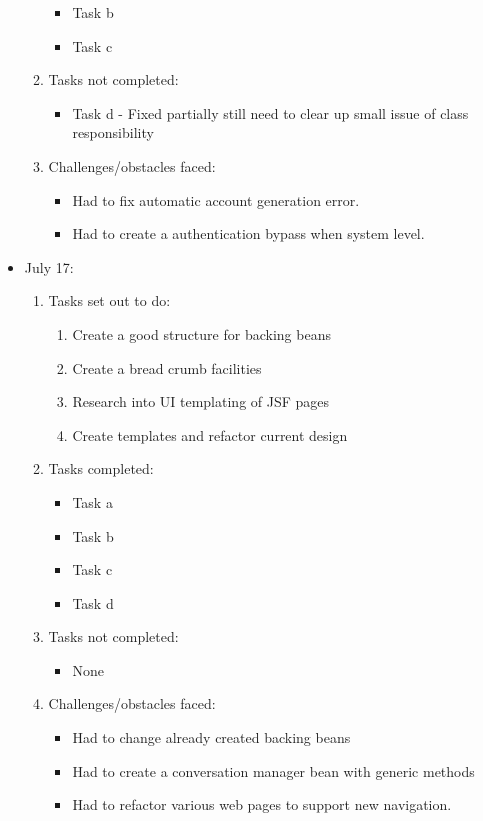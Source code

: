 \documentclass[12pt]{article}
\begin{document}
\begin{itemize}
\begin{enumerate}
\begin{itemize}
			\item Task b
			\item Task c								
		\end{itemize}
		\item Tasks not completed:
		\begin{itemize}
			\item Task d - Fixed partially still need to clear up small issue of class responsibility
		\end{itemize}
		\item Challenges/obstacles faced:
		\begin{itemize}
			\item Had to fix automatic account generation error.
			\item Had to create a authentication bypass when system level.
		\end{itemize}			
	\end{enumerate}
	\item July 17:
	\begin{enumerate}
		\item Tasks set out to do:
		\begin{enumerate}
			\item Create a good structure for backing beans
			\item Create a bread crumb facilities
			\item Research into UI templating of JSF pages
			\item Create templates and refactor current design			
		\end{enumerate}
		\item Tasks completed:
		\begin{itemize}
			\item Task a
			\item Task b
			\item Task c
			\item Task d								
		\end{itemize}
		\item Tasks not completed:
		\begin{itemize}
			\item None
		\end{itemize}
		\item Challenges/obstacles faced:
		\begin{itemize}
			\item Had to change already created backing beans
			\item Had to create a conversation manager bean with generic methods
			\item Had to refactor various web pages to support new navigation.

\end{itemize}
\end{enumerate}
\end{itemize}
\end{document}
